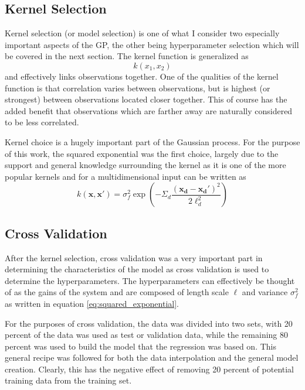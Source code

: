 \documentclass[12pt]{report}
\begin{document}
\subsection{Kernel Selection}
Kernel selection (or model selection) is one of what I consider two especially important aspects of the GP, the other being hyperparameter selection which will be covered in the next section. The kernel function is generalized as 
\begin{equation}
	k(x_1, x_2)
	\label{eq:kernel general}
\end{equation}
and effectively links observations together. One of the qualities of the kernel function is that correlation varies between observations, but is highest (or strongest) between observations located closer together. This of course has the added benefit that observations which are farther away are naturally considered to be less correlated.

Kernel choice is a hugely important part of the Gaussian process. For the purpose of this work, the squared exponential was the first choice, largely due to the support and general knowledge surrounding the kernel as it is one of the more popular kernels \cite{Cully15,Rasmussen06} and for a multidimensional input can be written as 
\begin{equation}
	k(\boldsymbol{x},\boldsymbol{x'})=\sigma_f^2\exp\left
	(-\Sigma_d\frac{(\boldsymbol{x_d}-\boldsymbol{x_d'})^2}{2\ell_d^2}\right)
	\label{eq:squared_exponential}
\end{equation}

\subsection{Cross Validation}
After the kernel selection, cross validation was a very important part in determining the characteristics of the model as cross validation is used to determine the hyperparameters. The hyperparameters can effectively be thought of as the gains of the system and are composed of length scale $\ell$ and variance $\sigma_f^2$ as written in equation \ref{eq:squared_exponential}. 

For the purposes of cross validation, the data was divided into two sets, with 20 percent of the data was used as test or validation data, while the remaining 80 percent was used to build the model that the regression was based on. This general recipe was followed for both the data interpolation and the general model creation. Clearly, this has the negative effect of removing 20 percent of potential training data from the training set.  
\end{document}
